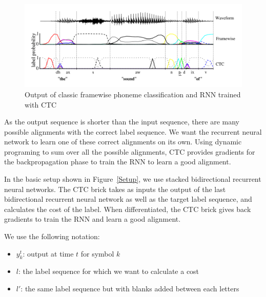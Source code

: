 \documentclass[11pt,a4paper]{article}
\begin{document}
\begin{figure}[h]
    \centering
    \includegraphics[width=1\linewidth]{azerty3.png}
    \caption{\small Output of classic framewise phoneme classification and RNN trained with CTC}
    \label{Example}
\end{figure}

As the output sequence is shorter than the input sequence, there are many possible alignments with the correct label sequence. We want the recurrent neural network to learn one of these correct alignments on its own. Using dynamic programing to sum over all the possible alignments, CTC provides gradients for the backpropagation phase to train the RNN to learn a good alignment.

In the basic setup shown in Figure~\ref{Setup}, we use stacked bidirectional recurrent neural networks. The CTC brick takes as inputs the output of the last bidirectional recurrent neural network as well as the target label sequence, and calculates the cost of the label. When differentiated, the CTC brick gives back gradients to train the RNN and learn a good alignment.



We use the following notation:

\begin{itemize}
    \item $y_k^t$: output at time $t$ for symbol $k$
    \item $l$: the label sequence for which we want to calculate a cost
	\item $l'$: the same label sequence but with blanks added between each letters
\end{itemize}
\end{document}
